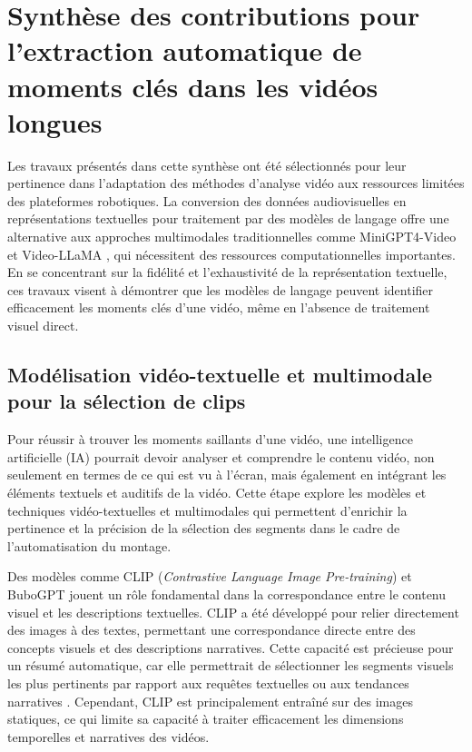 \documentclass[livre]{udes-genie-these}
\begin{document}
\chapter{Synthèse des contributions pour l’extraction automatique de moments clés dans les vidéos longues}


Les travaux présentés dans cette synthèse ont été sélectionnés pour leur pertinence dans l'adaptation des méthodes d'analyse vidéo aux ressources limitées des plateformes robotiques. La conversion des données audiovisuelles en représentations textuelles pour traitement par des modèles de langage offre une alternative aux approches multimodales traditionnelles comme MiniGPT4-Video \cite{ataallah2024minigpt4video} et Video-LLaMA \cite{anonymous2023_videollama}, qui nécessitent des ressources computationnelles importantes. En se concentrant sur la fidélité et l'exhaustivité de la représentation textuelle, ces travaux visent à démontrer que les modèles de langage peuvent identifier efficacement les moments clés d'une vidéo, même en l'absence de traitement visuel direct.

\section{Modélisation vidéo-textuelle et multimodale pour la sélection de clips}

Pour réussir à trouver les moments saillants d’une vidéo, une intelligence artificielle (IA) pourrait devoir analyser et comprendre le contenu vidéo, non seulement en termes de ce qui est vu à l’écran, mais également en intégrant les éléments textuels et auditifs de la vidéo. Cette étape explore les modèles et techniques vidéo-textuelles et multimodales qui permettent d’enrichir la pertinence et la précision de la sélection des segments dans le cadre de l’automatisation du montage. 

Des modèles comme CLIP \cite{bain2022}(\textit{Contrastive Language Image Pre-training}) et BuboGPT \cite{anonymous2023_bubogpt} jouent un rôle fondamental dans la correspondance entre le contenu visuel et les descriptions textuelles. CLIP a été développé pour relier directement des images à des textes, permettant une correspondance directe entre des concepts visuels et des descriptions narratives. Cette capacité est précieuse pour un résumé automatique, car elle permettrait de sélectionner les segments visuels les plus pertinents par rapport aux requêtes textuelles ou aux tendances narratives \cite{chen2023}\cite{ghosh2019_excl}. Cependant, CLIP est principalement entraîné sur des images statiques, ce qui limite sa capacité à traiter efficacement les dimensions temporelles et narratives des vidéos.
\end{document}
